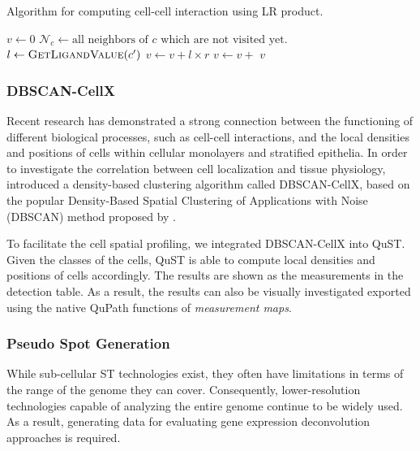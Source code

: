 \documentclass{article}
\begin{document}
\begin{algorithm}[tbp]
	\caption{Algorithm for computing cell-cell interaction using LR product.}\label{alg:cci}
	\begin{algorithmic}[1]
			\State $v \gets 0$
			\State $\mathcal{N}_{c} \gets \text{all neighbors of }c\text{ which are not visited yet.}$
			\State $l \gets \Call{GetLigandValue}{c'}$
			\State $v \gets v+l\times r$
				\State $v\gets v+$
				\EndIf
			\EndFor
			\Return $v$
			\EndProcedure		
		\end{algorithmic}
\end{algorithm}

\subsubsection{DBSCAN-CellX}
\label{sec:dbscancellx}

Recent research has demonstrated a strong connection between the functioning of different biological processes, such as cell-cell interactions, and the local densities and positions of cells within cellular monolayers and stratified epithelia. In order to investigate the correlation between cell localization and tissue physiology, \cite{Kuchenhoff:2023} introduced a density-based clustering algorithm called DBSCAN-CellX, based on the popular Density-Based Spatial Clustering of Applications with Noise (DBSCAN) method proposed by \cite{Ester:1996}.

To facilitate the  cell spatial profiling, we integrated DBSCAN-CellX into QuST. Given the classes of the cells, QuST is able to compute local densities and positions of cells accordingly. The results are shown as the measurements in the detection table. As a result, the results can also be visually investigated exported using the native QuPath functions of \emph{measurement maps}.

\subsubsection{Pseudo Spot Generation}
\label{sec:pseudospotgeneration}

While sub-cellular ST technologies exist, they often have limitations in terms of the range of the genome they can cover. Consequently, lower-resolution technologies capable of analyzing the entire genome continue to be widely used. As a result, generating data for evaluating gene expression deconvolution approaches is required. 
\end{document}
